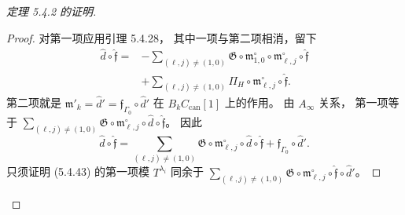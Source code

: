 \begin{proof}[定理 5.4.2 的证明]
\begin{proof}
对第一项应用引理 5.4.28，
其中一项与第二项相消，留下
\begin{equation}
\begin{aligned}
\widehat d\circ\widehat{\mathfrak f}
={}&-\sum_{(\ell,j)\ne(1,0)}
\mathfrak G\circ\mathfrak m^\circ_{1,0}
\circ\mathfrak m^\circ_{\ell,j}
\circ\widehat{\mathfrak f}\\
&+\sum_{(\ell,j)\ne(1,0)}
\Pi_H\circ\mathfrak m^\circ_{\ell,j}
\circ\widehat{\mathfrak f}.
\end{aligned}
\tag{5.4.42}\label{eq:5-4-42}
\end{equation}
第二项就是
$\mathfrak m'_k=\widehat d'
=\mathfrak f_{\Gamma_0}\circ\widehat d'$
在 $B_kC_{\mathrm{can}}[1]$ 上的作用。
由 $A_\infty$ 关系，
第一项等于
$\sum_{(\ell,j)\ne(1,0)}
\mathfrak G\circ\mathfrak m^\circ_{\ell,j}
\circ\widehat d\circ\widehat{\mathfrak f}$。
因此
\begin{equation}
\widehat d\circ\widehat{\mathfrak f}
=\sum_{(\ell,j)\ne(1,0)}
\mathfrak G\circ\mathfrak m^\circ_{\ell,j}
\circ\widehat d\circ\widehat{\mathfrak f}
+\mathfrak f_{\Gamma_0}\circ\widehat d'.
\tag{5.4.43}\label{eq:5-4-43}
\end{equation}
只须证明 (5.4.43) 的第一项模
$T^{\lambda_i}$ 同余于
$\sum_{(\ell,j)\ne(1,0)}
\mathfrak G\circ\mathfrak m^\circ_{\ell,j}
\circ\widehat{\mathfrak f}\circ\widehat d'$。


\end{proof}
\end{proof}
